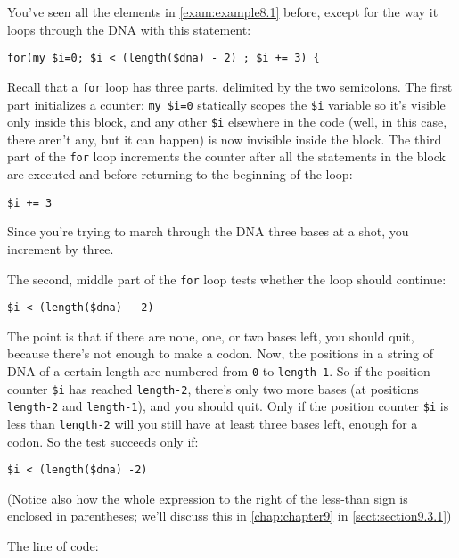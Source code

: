 You've seen all the elements in \autoref{exam:example8.1} before, except for the way it loops through the DNA with this statement:

\begin{lstlisting}
for(my $i=0; $i < (length($dna) - 2) ; $i += 3) {
\end{lstlisting}

Recall that a \verb|for| loop has three parts, delimited by the two semicolons. The first part initializes a counter: \verb|my $i=0| statically scopes the \verb|$i| variable so it's visible only inside this block, and any other \verb|$i| elsewhere in the code (well, in this case, there aren't any, but it can happen) is now invisible inside the block. The third part of the \verb|for| loop increments the counter after all the statements in the block are executed and before returning to the beginning of the loop:

\begin{lstlisting}
$i += 3
\end{lstlisting}

Since you're trying to march through the DNA three bases at a shot, you increment by three.

The second, middle part of the \verb|for| loop tests whether the loop should continue:

\begin{lstlisting}
$i < (length($dna) - 2)
\end{lstlisting}

The point is that if there are none, one, or two bases left, you should quit, because there's not enough to make a codon. Now, the positions in a string of DNA of a certain length are numbered from \verb|0| to \verb|length-1|. So if the position counter \verb|$i| has reached \verb|length-2|, there's only two more bases (at positions \verb|length-2| and \verb|length-1|), and you should quit. Only if the position counter \verb|$i| is less than \verb|length-2| will you still have at least three bases left, enough for a codon. So the test succeeds only if:

\begin{lstlisting}
$i < (length($dna) -2)
\end{lstlisting}

(Notice also how the whole expression to the right of the less-than sign is enclosed in parentheses; we'll discuss this in \autoref{chap:chapter9} in \autoref{sect:section9.3.1})

The line of code:

